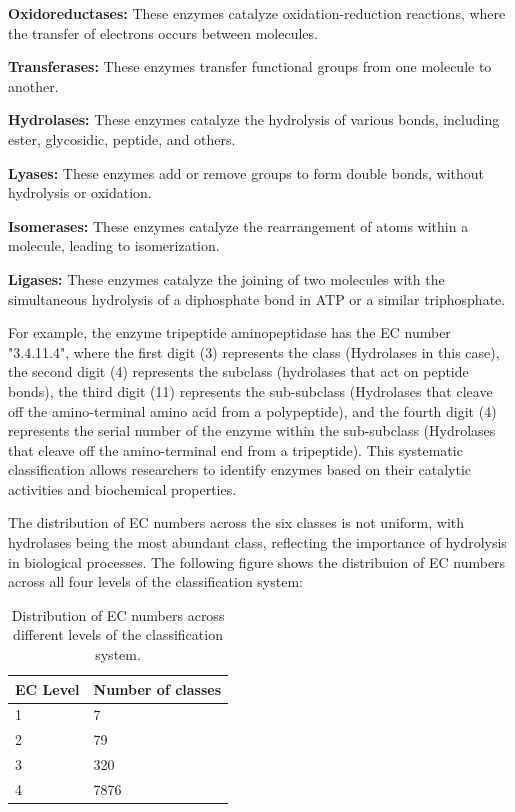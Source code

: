 \begin{compactenum}
    \item \textbf{Oxidoreductases:} These enzymes catalyze oxidation-reduction reactions, where the transfer of electrons occurs between molecules.
    \item \textbf{Transferases:} These enzymes transfer functional groups from one molecule to another.
    \item \textbf{Hydrolases:} These enzymes catalyze the hydrolysis of various bonds, including ester, glycosidic, peptide, and others.
    \item \textbf{Lyases:} These enzymes add or remove groups to form double bonds, without hydrolysis or oxidation.
    \item \textbf{Isomerases:} These enzymes catalyze the rearrangement of atoms within a molecule, leading to isomerization.
    \item \textbf{Ligases:} These enzymes catalyze the joining of two molecules with the simultaneous hydrolysis of a diphosphate bond in ATP or a similar triphosphate.
    \item 
\end{compactenum}

For example, the enzyme tripeptide aminopeptidase has the EC number "3.4.11.4", where the first digit (3) represents the class (Hydrolases in this case), the second digit (4) represents the subclass (hydrolases that act on peptide bonds), the third digit (11) represents the sub-subclass (Hydrolases that cleave off the amino-terminal amino acid from a polypeptide), and the fourth digit (4) represents the serial number of the enzyme within the sub-subclass (Hydrolases that cleave off the amino-terminal end from a tripeptide). This systematic classification allows researchers to identify enzymes based on their catalytic activities and biochemical properties. \autocite{EnzymeNomenclatureRecommendations1994}

The distribution of EC numbers across the six classes is not uniform, with hydrolases being the most abundant class, reflecting the importance of hydrolysis in biological processes. The following figure shows the distribuion of EC numbers across all four levels of the classification system:

\begin{table}[hbt]
    \centering
    \begin{tabular}{@{}ll@{}}
    \toprule
    \textbf{EC Level} & \textbf{Number of classes} \\ \midrule
    1                 & 7                          \\
    2                 & 79                         \\
    3                 & 320                        \\
    4                 & 7876                       \\ \bottomrule
    \end{tabular}
    \caption{Distribution of EC numbers across different levels of the classification system.}
    \label{tab:ec-level-distribution}
\end{table}

